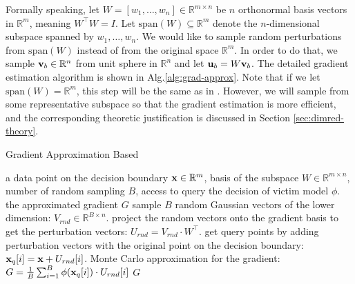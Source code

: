 Formally speaking, let $W=[w_1, \ldots, w_n] \in \mathbb{R}^{m\times n}$ be $n$ orthonormal basis vectors in $\mathbb{R}^m$, meaning $W^\intercal W = I$. Let $\text{span}(W) \subseteq \mathbb{R}^m$ denote the $n$-dimensional subspace spanned by $w_1, \ldots, w_n$. We would like to sample random perturbations from $\text{span}(W)$ instead of from the original space $\mathbb{R}^m$. In order to do that, we sample ${\bf v}_b \in \mathbb{R}^n$ from unit sphere in $\mathbb{R}^n$ and let ${\bf u}_b = W {\bf v}_b$. The detailed gradient estimation algorithm is shown in Alg.\ref{alg:grad-approx}. 
Note that if we let $\text{span}(W)=\mathbb{R}^m$, this step will be the same as in \cite{chen2019hopskipjumpattack}. However, we will sample from some representative subspace so that the gradient estimation is more efficient, and the corresponding theoretic justification is discussed in Section \ref{sec:dimred-theory}.

\begin{algorithm}
\caption{Gradient Approximation Based \name}
\label{alg:grad-approx}
\begin{algorithmic}[1]
\renewcommand{\algorithmicrequire}{\textbf{Input:}}
 \renewcommand{\algorithmicensure}{\textbf{Output:}}
 \REQUIRE a data point on the decision boundary ${\bf x} \in \mathbb{R}^m$, basis of the subspace $W \in \mathbb{R}^{m\times n}$, number of random sampling $B$, access to query the decision of victim model $\phi$.
 \ENSURE the approximated gradient $G$
 \STATE sample $B$ random Gaussian vectors of the lower dimension: $V_{rnd} \in \mathbb{R}^{B \times n}$.
 \STATE project the random vectors onto the gradient basis to get the perturbation vectors: $U_{rnd} = V_{rnd} \cdot W^\intercal$.
 \STATE get query points by adding perturbation vectors with the original point on the decision boundary: ${\bf x}_q[i] = {\bf x} + U_{rnd}[i]$.
 \STATE Monte Carlo approximation for the gradient: $G = \frac{1}{B}\sum_{i=1}^{B} \phi({\bf x}_q[i]) \cdot U_{rnd}[i]$
 \RETURN $G$
\end{algorithmic}
\end{algorithm}
\vspace{-0.5cm}


